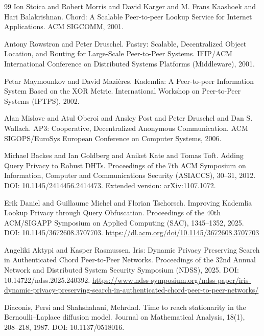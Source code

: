 \documentclass[11pt]{article}
\begin{document}
\begin{thebibliography}{99}
Ion Stoica and Robert Morris and David Karger and M. Frans Kaashoek and Hari Balakrishnan.
\newblock Chord: A Scalable Peer-to-peer Lookup Service for Internet Applications.
\newblock ACM SIGCOMM, 2001.

Antony Rowstron and Peter Druschel.
\newblock Pastry: Scalable, Decentralized Object Location, and Routing for Large-Scale Peer-to-Peer Systems.
\newblock IFIP/ACM International Conference on Distributed Systems Platforms (Middleware), 2001.

Petar Maymounkov and David Mazi{\`e}res.
\newblock Kademlia: A Peer-to-peer Information System Based on the XOR Metric.
\newblock International Workshop on Peer-to-Peer Systems (IPTPS), 2002.

Alan Mislove and Atul Oberoi and Ansley Post and Peter Druschel and Dan S. Wallach.
\newblock AP3: Cooperative, Decentralized Anonymous Communication.
\newblock ACM SIGOPS/EuroSys European Conference on Computer Systems, 2006.

Michael Backes and Ian Goldberg and Aniket Kate and Tomas Toft.
\newblock Adding Query Privacy to Robust DHTs.
\newblock Proceedings of the 7th ACM Symposium on Information, Computer and Communications Security (ASIACCS), 30--31, 2012.
\newblock DOI: 10.1145/2414456.2414473.
\newblock Extended version: arXiv:1107.1072.

Erik Daniel and Guillaume Michel and Florian Tschorsch.
\newblock Improving {Kademlia} Lookup Privacy through Query Obfuscation.
\newblock Proceedings of the 40th {ACM}/{SIGAPP} Symposium on Applied Computing (SAC), 1345--1352, 2025.
\newblock DOI: 10.1145/3672608.3707703.
\newblock \url{https://dl.acm.org/doi/10.1145/3672608.3707703}

Angeliki Aktypi and Kasper Rasmussen.
\newblock Iris: Dynamic Privacy Preserving Search in Authenticated Chord Peer-to-Peer Networks.
\newblock Proceedings of the 32nd Annual Network and Distributed System Security Symposium (NDSS), 2025.
\newblock DOI: 10.14722/ndss.2025.240392.
\newblock \url{https://www.ndss-symposium.org/ndss-paper/iris-dynamic-privacy-preserving-search-in-authenticated-chord-peer-to-peer-networks/}

Diaconis, Persi and Shahshahani, Mehrdad.
\newblock Time to reach stationarity in the {B}ernoulli--{L}aplace diffusion model.
 Journal on Mathematical Analysis, 18(1), 208--218, 1987.
\newblock DOI: 10.1137/0518016.


\end{thebibliography}
\end{document}
